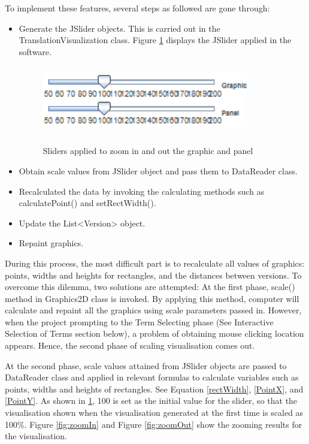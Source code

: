 To implement these features, several steps as followed are gone through:
\begin{itemize}
	\item \textbf{} Generate the JSlider objects. This is carried out in the TranslationVisualization class. Figure \ref{fig:jSliders} displays the JSlider applied in the software.
	\begin{figure}[h]
		\centering	
		\includegraphics[width=9cm, height=3cm]{Figs/JSliders}\\[1ex]
		\caption{ Sliders applied to zoom in and out the graphic and panel}
		\label{fig:jSliders}
	\end{figure} 	
	\item \textbf{} Obtain scale values from JSlider object and pass them to DataReader class.
	\item \textbf{} Recalculated the data by invoking the calculating methods such as calculatePoint() and setRectWidth().
	\item \textbf{} Update the List<Version> object.
	\item \textbf{} Repaint graphics.
\end{itemize} 
 
During this process, the most difficult part is to recalculate all values of graphics: points, widths and heights for rectangles, and the distances between versions. To overcome this dilemma, two solutions are attempted:
At the first phase, scale() method in Graphics2D class is invoked. By applying this method, computer will calculate and repaint all the graphics using scale parameters passed in. However, when the project prompting to the Term Selecting phase (See Interactive Selection of Terms section below), a problem of obtaining mouse clicking location appears. Hence, the second phase of scaling visualisation comes out.  

At the second phase, scale values attained from JSlider objects are passed to DataReader class and applied in relevant formulas to calculate variables such as points, widths and heights of rectangles. See Equation \eqref{rectWidth}, \eqref{PointX}, and \eqref{PointY}. As shown in \ref{fig:jSliders}, 100 is set as the initial value for the slider, so that the visualisation shown when the visualisation generated at the first time is scaled as 100\%. Figure \ref{fig:zoomIn} and Figure \ref{fig:zoomOut} show the zooming results for the visualisation.

